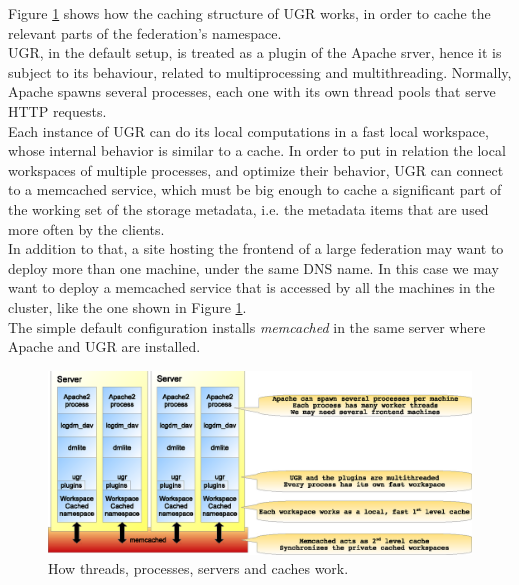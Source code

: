 \documentclass[12pt]{article} %
\begin{document}
Figure \ref{fig_cache} shows how the caching structure of UGR works, in order to cache the relevant parts of the federation's namespace.\\

UGR, in the default setup, is treated as a plugin of the Apache srver, hence it is subject to its behaviour, related to multiprocessing and multithreading. Normally, Apache spawns several processes, each one with its own thread pools that serve HTTP requests.\\

Each instance of UGR can do its local computations in a fast local workspace, whose internal behavior is similar to a cache. In order to put in relation the local workspaces of multiple processes, and optimize their behavior, UGR can connect to a memcached service, which must be big enough to cache a significant part of the working set of the storage metadata, i.e. the metadata items that are used more often by the clients.\\

In addition to that, a site hosting the frontend of a large federation may want to deploy more than one machine, under the same DNS name. In this case we may want to deploy a memcached service that is accessed by all the machines in the cluster, like the one shown in Figure \ref{fig_cache}.\\

The simple default configuration installs \textit{memcached} in the same server where Apache and UGR are installed.\\

\begin{figure}
  \begin{center}
    \includegraphics[width=36pc]{cache.eps}
  \end{center}
  \caption{\label{fig_cache}How threads, processes, servers and caches work.}
\end{figure}
\end{document}
